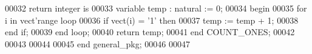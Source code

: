 \begin{DoxyCode}
00032       \textcolor{keywordflow}{return} \textcolor{comment}{integer} \textcolor{keywordflow}{is}
00033       \textcolor{keywordflow}{variable} temp : \textcolor{comment}{natural} := \textcolor{vhdllogic}{}\textcolor{vhdllogic}{0};
00034    \textcolor{keywordflow}{begin}  
00035       \textcolor{keywordflow}{for} i \textcolor{keywordflow}{in} vect'\textcolor{keywordflow}{range} \textcolor{keywordflow}{loop}
00036          \textcolor{keywordflow}{if} vect\textcolor{vhdlchar}{(}i\textcolor{vhdlchar}{)} = '\textcolor{vhdllogic}{}\textcolor{vhdllogic}{1}' \textcolor{keywordflow}{then} 
00037             temp := temp + \textcolor{vhdllogic}{}\textcolor{vhdllogic}{1};
00038          \textcolor{keywordflow}{end} \textcolor{keywordflow}{if};
00039       \textcolor{keywordflow}{end} \textcolor{keywordflow}{loop};
00040       \textcolor{keywordflow}{return} temp;
00041    \textcolor{keywordflow}{end} COUNT\_ONES;
00042    
00043    
00044    
00045 \textcolor{keywordflow}{end} \textcolor{vhdlchar}{general\_pkg};
00046       
00047       
\end{DoxyCode}
